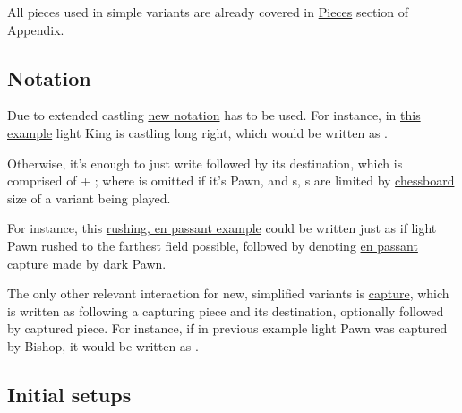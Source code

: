 
All pieces used in simple variants are already covered in
\hyperref[sec:Appendix/Introduction/Pieces]{Pieces} section of Appendix.

\clearpage %

\subsection*{Notation}
\label{sec:Simple variants/Summary/Notation}

Due to extended castling \hyperref[sec:Appendix/Notation/Castling]{new notation}
has to be used. For instance, in
\hyperref[fig:classic14_castling_left_00_05]{this example} light King is
castling long right, which would be written as .

Otherwise, it's enough to just write  followed by its destination,
which is comprised of  + ; where  is
omitted if it's Pawn, and s, s are limited by
\hyperref[tbl:Simple variants/Summary/Chessboards]{chessboard} size of a variant
being played.

For instance, this
\hyperref[fig:24_classic14_en_passant]{rushing, en passant example} could
be written just as  if light Pawn rushed to the farthest field
possible, followed by  denoting
\hyperref[sec:Appendix/Notation/En passant]{en passant} capture made by dark Pawn.

The only other relevant interaction for new, simplified variants is
\hyperref[sec:Appendix/Notation/Capturing]{capture}, which is written as \alg{*}
following a capturing piece and its destination, optionally followed by captured
piece. For instance, if in previous example light Pawn was captured by Bishop,
it would be written as .

\clearpage %

\subsection*{Initial setups}
\label{sec:Simple variants/Summary/Initial setups}

